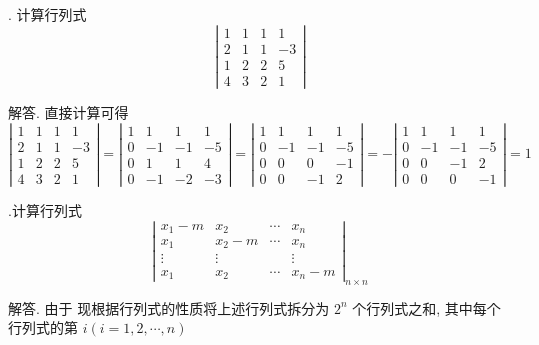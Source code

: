 \documentclass{article}
\begin{document}
\vspace{1ex}
{.} 计算行列式
$$
    \left|\begin{array}{cccc}
        1 & 1 & 1 & 1  \\
        2 & 1 & 1 & -3 \\
        1 & 2 & 2 & 5  \\
        4 & 3 & 2 & 1
    \end{array}\right|
$$

解答. 直接计算可得
$$
    \left|\begin{array}{cccc}
        1 & 1 & 1 & 1  \\
        2 & 1 & 1 & -3 \\
        1 & 2 & 2 & 5  \\
        4 & 3 & 2 & 1
    \end{array}\right|=\left|\begin{array}{cccc}
        1 & 1  & 1  & 1  \\
        0 & -1 & -1 & -5 \\
        0 & 1  & 1  & 4  \\
        0 & -1 & -2 & -3
    \end{array}\right|=\left|\begin{array}{cccc}
        1 & 1  & 1  & 1  \\
        0 & -1 & -1 & -5 \\
        0 & 0  & 0  & -1 \\
        0 & 0  & -1 & 2
    \end{array}\right|=-\left|\begin{array}{cccc}
        1 & 1  & 1  & 1  \\
        0 & -1 & -1 & -5 \\
        0 & 0  & -1 & 2  \\
        0 & 0  & 0  & -1
    \end{array}\right|=1
$$

\vspace{1ex}
{.}计算行列式
$$
    \left|\begin{array}{cccc}
        x_{1}-m & x_{2}   & \cdots & x_{n}   \\
        x_{1}   & x_{2}-m & \cdots & x_{n}   \\
        \vdots  & \vdots  &        & \vdots  \\
        x_{1}   & x_{2}   & \cdots & x_{n}-m
    \end{array}\right|_{n \times n}
$$

解答. 由于
现根据行列式的性质将上述行列式拆分为 $2^{n}$ 个行列式之和, 其中每个行列式的第 $i(i=1,2, \cdots, n)$
\end{document}
